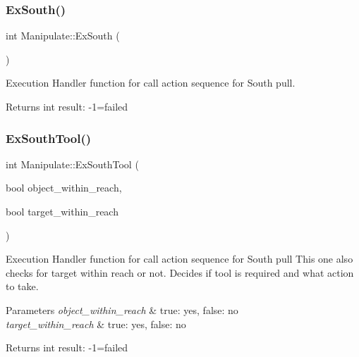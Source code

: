 \subsubsection{\texorpdfstring{Ex\+South()}{ExSouth()}}
{\footnotesize\ttfamily int Manipulate\+::\+Ex\+South (\begin{DoxyParamCaption}{ }\end{DoxyParamCaption})\hspace{0.3cm}{\ttfamily [private]}}



Execution Handler function for call action sequence for South pull. 

\begin{DoxyReturn}{Returns}
int result\+: -\/1=failed 
\end{DoxyReturn}
\mbox{\label{structManipulate_a0fa003e72a0b1a6bccf2658ebf49d3af}} 
\subsubsection{\texorpdfstring{Ex\+South\+Tool()}{ExSouthTool()}}
{\footnotesize\ttfamily int Manipulate\+::\+Ex\+South\+Tool (\begin{DoxyParamCaption}\item[{bool}]{object\+\_\+within\+\_\+reach,  }\item[{bool}]{target\+\_\+within\+\_\+reach }\end{DoxyParamCaption})\hspace{0.3cm}{\ttfamily [private]}}



Execution Handler function for call action sequence for South pull This one also checks for target within reach or not. Decides if tool is required and what action to take. 


\begin{DoxyParams}{Parameters}
{\em object\+\_\+within\+\_\+reach} & true\+: yes, false\+: no \\
\hline
{\em target\+\_\+within\+\_\+reach} & true\+: yes, false\+: no \\
\hline
\end{DoxyParams}
\begin{DoxyReturn}{Returns}
int result\+: -\/1=failed 
\end{DoxyReturn}
\mbox{\label{structManipulate_a696de40873f30c2702d53bf9e342c1da}} 
